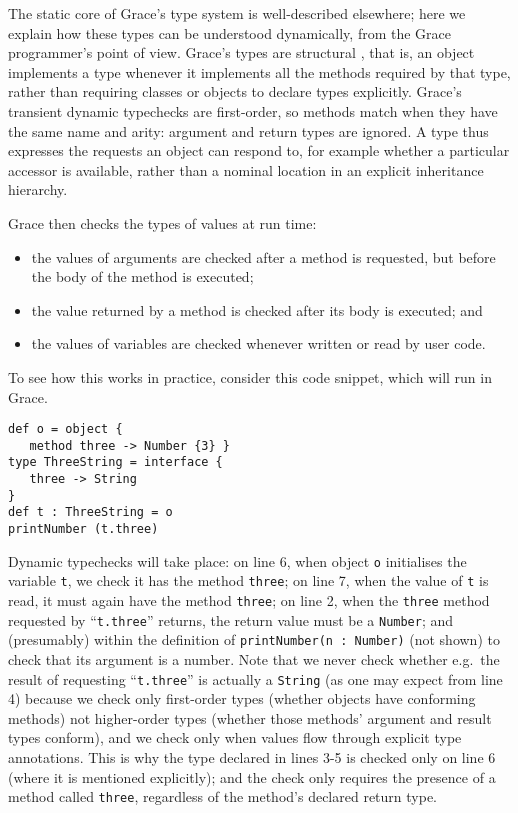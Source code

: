\documentclass[sigplan,10pt,review,screen]{acmart}\settopmatter{printfolios=true}
\newcommand{\code}[1]{\texttt{#1}}
\begin{document}
The static core of Grace's type system is well-described
elsewhere\citep{TimJonesThesis};
here we explain how
these types can be understood 
dynamically, from the Grace programmer's point of view.
Grace's types are structural \citep{graceOnward12},
that is, an object implements a type whenever it
implements all the methods required by that type,
rather than requiring classes or objects to declare types explicitly.
Grace's transient dynamic typechecks are first-order, so methods match when they have
the same name and arity: 
argument and return types are ignored.
A type thus expresses the requests an object can respond to,
for example whether a particular accessor is available,
rather than a nominal location in an explicit inheritance hierarchy.

Grace then checks the types of values at run time:
%
\begin{itemize}
\item the values of arguments are checked after a method is requested, 
      but before the body of the method is executed;
\item the value returned by a method is checked after its body is executed; and
\item the values of variables are checked
      whenever written or read by user code.
\end{itemize}

To see how this works in practice, consider this code snippet, which
will run in Grace.

\begin{lstlisting}
def o = object {
   method three -> Number {3} }
type ThreeString = interface {
   three -> String
}
def t : ThreeString = o
printNumber (t.three)
\end{lstlisting}

Dynamic typechecks will take place: on line 6, when object \code{o}
initialises the variable \code{t}, we check it has the method
\code{three}; on line 7, when the value of \code{t} is read, it must
again have the method \code{three}; on line 2, when the \code{three}
method requested by ``\code{t.three}'' returns, the return value must
be a \code{Number}; and (presumably) within the definition of 
%
\code{printNumber(n :   Number)} 
%
(not shown) to check that its argument is a number. Note that we never check
whether e.g.\ the result of requesting ``\code{t.three}'' is actually
a \code{String} (as one may expect from line 4) because we check
only first-order types (whether objects have conforming methods) not higher-order
types (whether those methods' argument and result types conform), and
we check only when values flow through explicit type annotations.
This is why the type declared in lines 3-5 is checked only on line 6
(where it is mentioned explicitly); and the check only requires the
presence of a method called \code{three}, regardless of the method's
declared return type.
\end{document}
